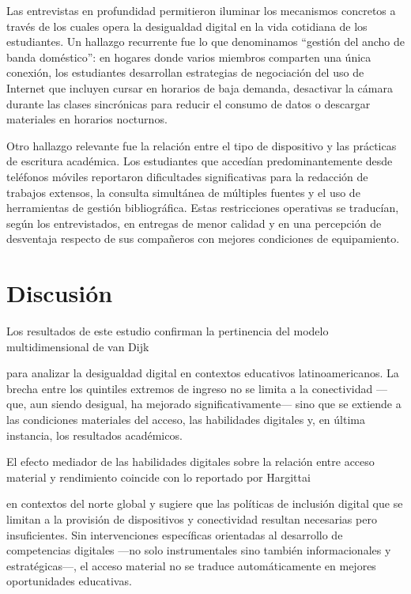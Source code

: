     
    Las entrevistas en profundidad permitieron iluminar los mecanismos concretos a través de los cuales opera la desigualdad digital en la vida cotidiana de los estudiantes. Un hallazgo recurrente fue lo que denominamos “gestión del ancho de banda doméstico”: en hogares donde varios miembros comparten una única conexión, los estudiantes desarrollan estrategias de negociación del uso de Internet que incluyen cursar en horarios de baja demanda, desactivar la cámara durante las clases sincrónicas para reducir el consumo de datos o descargar materiales en horarios nocturnos.
   
   


    
    Otro hallazgo relevante fue la relación entre el tipo de dispositivo y las prácticas de escritura académica. Los estudiantes que accedían predominantemente desde teléfonos móviles reportaron dificultades significativas para la redacción de trabajos extensos, la consulta simultánea de múltiples fuentes y el uso de herramientas de gestión bibliográfica. Estas restricciones operativas se traducían, según los entrevistados, en entregas de menor calidad y en una percepción de desventaja respecto de sus compañeros con mejores condiciones de equipamiento.
   
   


\section{Discusión}

    
    Los resultados de este estudio confirman la pertinencia del modelo multidimensional de van Dijk 
    
    \autocite{2553-VANDIJK2020}
    
     para analizar la desigualdad digital en contextos educativos latinoamericanos. La brecha entre los quintiles extremos de ingreso no se limita a la conectividad —que, aun siendo desigual, ha mejorado significativamente— sino que se extiende a las condiciones materiales del acceso, las habilidades digitales y, en última instancia, los resultados académicos.
   
   


    
    El efecto mediador de las habilidades digitales sobre la relación entre acceso material y rendimiento coincide con lo reportado por Hargittai 
    
    \autocite{2555-HARGITTAI2002}
    
     en contextos del norte global y sugiere que las políticas de inclusión digital que se limitan a la provisión de dispositivos y conectividad resultan necesarias pero insuficientes. Sin intervenciones específicas orientadas al desarrollo de competencias digitales —no solo instrumentales sino también informacionales y estratégicas—, el acceso material no se traduce automáticamente en mejores oportunidades educativas.
   
